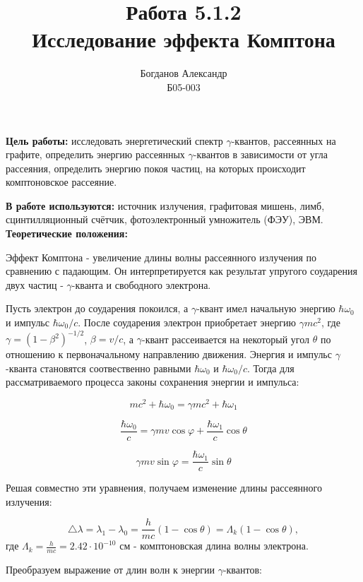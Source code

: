 \documentclass[a4paper, 12pt]{article}%
\author{Богданов Александр \\
	Б05-003}
\title{\textbf{Работа 5.1.2 \\ 
		Исследование эффекта Комптона}}
\begin{document}
\maketitle

\textbf{Цель работы:}  исследовать энергетический спектр $\gamma$-квантов,  рассеянных на графите,  определить энергию рассеянных $\gamma$-квантов в зависимости от угла рассеяния,  определить энергию покоя частиц,  на которых происходит комптоновское рассеяние.

\textbf{В работе используются:} источник излучения,  графитовая мишень,  лимб, сцинтилляционный счётчик,  фотоэлектронный умножитель (ФЭУ),  ЭВМ.\\

\textbf{Теоретические положения:}\\\par

	Эффект Комптона - увеличение длины волны рассеянного излучения по сравнению с падающим. Он интерпретируется как результат упругого соударения двух частиц - $\gamma$-кванта и свободного электрона. \par
	
	Пусть электрон до соударения покоился,  а  $\gamma$-квант имел начальную энергию $\hbar \omega_0$ и импульс $\hbar \omega_0/c$.  После соударения электрон приобретает энергию $\gamma mc^2$,  где $\gamma = (1 - \beta^2)^{-1/2}$,  $\beta = v/c$,  а  $\gamma$-квант рассеивается на некоторый угол $\theta$ по отношению к первоначальному направлению движения.  Энергия и импульс $\gamma$-кванта становятся соотвественно равными  $\hbar \omega_0$ и $\hbar \omega_0/c$.  Тогда для рассматриваемого процесса законы сохранения энергии и импульса:

\[ mc^2 + \hbar \omega_0 = \gamma mc^2 + \hbar \omega_1\]

\[\frac{\hbar \omega_0}{c} = \gamma mv \cos \varphi + \frac{\hbar \omega_1}{c} \cos \theta\]

\[\gamma mv \sin \varphi = \frac{\hbar \omega_1}{c} \sin \theta\]

Решая совместно эти уравнения,  получаем изменение длины рассеянного излучения:

    \[\triangle \lambda = \lambda_1 - \lambda_0 = \frac{h}{mc}(1 - \cos \theta) = \Lambda_k(1 - \cos \theta),\]
где $\Lambda_k = \frac{h}{mc} = 2.42 \cdot 10^{-10}$ см - комптоновская длина волны электрона. \par

Преобразуем выражение от длин волн к энергии $\gamma$-квантов:
\end{document}
